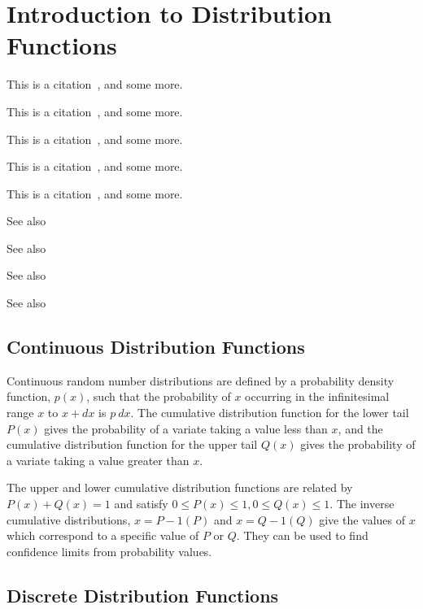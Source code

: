 \section{Introduction to Distribution Functions}
\label{DistributionFunctionsIntroduction} 


This is a citation~\citet{walck_2007}, and some more.

This is a citation~\citet{VanHauwermeiren_2009}, and some more.

This is a citation~\citet{Rinne_book_2008}, and some more.

This is a citation~\citet{Johnson_1994}, and some more.

This is a citation~\citet{Johnson_1995}, and some more.
%
%
%


See also \cite{Monahan_2011}

See also \cite{Lange_2010}

See also \cite{Chernick_2008}

See also \cite{Cheney_2008}


\subsection{Continuous Distribution Functions}

Continuous random number distributions are defined by a probability density function, $p(x)$, such that the probability of $x$ occurring in the infinitesimal range $x$ to $x +dx$ is $p\ dx$. The cumulative distribution function for the lower tail $P(x)$ gives the probability of a variate taking a value less than $x$, and the cumulative distribution function for the upper tail $Q(x)$ gives the probability of a variate taking a value greater than $x$. 

The upper and lower cumulative distribution functions are related by $P(x) + Q(x) = 1$ and satisfy $0 \leq P(x) \leq 1, 0 \leq Q(x) \leq 1$. The inverse cumulative distributions, $x = P-1(P)$ and $x = Q-1(Q)$ give the values of $x$ which correspond to a specific value of $P$ or $Q$. They can be used to find confidence limits from probability values. 



\subsection{Discrete Distribution Functions}

